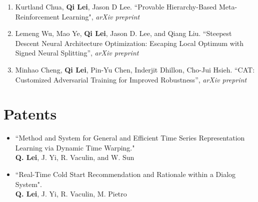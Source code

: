 \documentclass[margin, 10pt]{res} %
\begin{document}
\begin{resume}
\begin{enumerate}
\item{Kurtland Chua, \textbf{Qi Lei}, Jason D Lee. ``Provable Hierarchy-Based Meta-Reinforcement Learning", \textit{arXiv preprint} }

\item{Lemeng Wu, Mao Ye, \textbf{Qi Lei}, Jason D. Lee, and Qiang Liu. ``Steepest Descent Neural Architecture Optimization: Escaping Local Optimum with Signed Neural Splitting”, \textit{arXiv preprint}}

\item{ Minhao Cheng, \textbf{Qi Lei}, Pin-Yu Chen, Inderjit Dhillon, Cho-Jui Hsieh. ``CAT: Customized Adversarial Training for Improved Robustness”, \textit{arXiv preprint}}


\end{enumerate} 

\section{Patents}\begin{itemize}
	\item{``Method and System for General and Efficient Time Series Representation 
		Learning via Dynamic Time Warping."\\
		\textbf{Q. Lei}, J. Yi, R. Vaculin, and W. Sun}
	
	\item{``Real-Time Cold Start Recommendation and Rationale within a Dialog System".\\
		\textbf{Q. Lei}, J. Yi, R. Vaculin, M. Pietro}
\end{itemize}
\begin{comment}
\section{SOFTWARE}
 \textit{Github: }\url{https://github.com/cecilialeiqi/}\\
 {\sl SPIRAL} \hfill May 2016 - July 2017
 \begin{itemize}
   \item Feature representation learning of any time series data
    \end{itemize}
 {\sl DDI} \hfill Jan 2017 - May 2017
 \begin{itemize}
   \item Use an inductive tensor completion based methods to predict drug-drug interactions
   \end{itemize}
   {\sl NUTF} \hfill August 2016 - February 2017
   \begin{itemize}
     \item Negative-Unlabeled Tensor Factorization for Location\ Context 
       Inference from Inaccurate Mobility Data
      \end{itemize}
 \end{itemize} 
\end{comment}


\end{resume}
\end{document}
